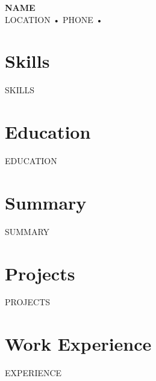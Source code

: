\documentclass[11pt]{article}
\begin{document}
\noindent
\textbf{\LARGE {NAME}} \\
{LOCATION} • {PHONE} • \href{{mailto:{EMAIL}}} \\
\href{}{}

\section*{Skills}
{SKILLS}

\section*{Education}
{EDUCATION}

\section*{Summary}
{SUMMARY}

\section*{Projects}
{PROJECTS}

\section*{Work Experience}
{EXPERIENCE}
\end{document}
